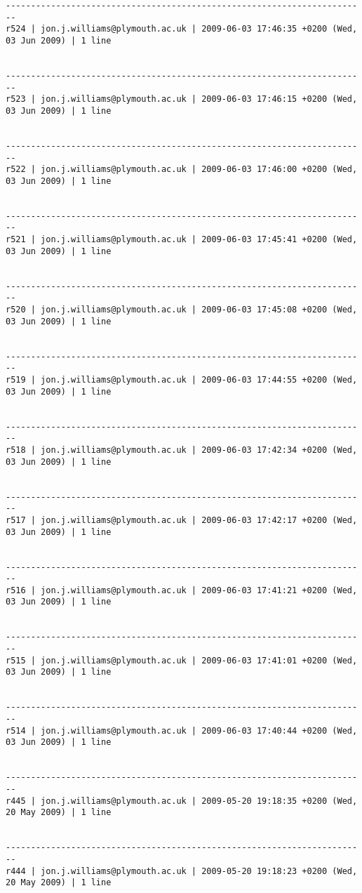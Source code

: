 \documentclass[9]{report}
\begin{document}
\begin{description}
\begin{verbatim}
------------------------------------------------------------------------
r524 | jon.j.williams@plymouth.ac.uk | 2009-06-03 17:46:35 +0200 (Wed, 03 Jun 2009) | 1 line


------------------------------------------------------------------------
r523 | jon.j.williams@plymouth.ac.uk | 2009-06-03 17:46:15 +0200 (Wed, 03 Jun 2009) | 1 line


------------------------------------------------------------------------
r522 | jon.j.williams@plymouth.ac.uk | 2009-06-03 17:46:00 +0200 (Wed, 03 Jun 2009) | 1 line


------------------------------------------------------------------------
r521 | jon.j.williams@plymouth.ac.uk | 2009-06-03 17:45:41 +0200 (Wed, 03 Jun 2009) | 1 line


------------------------------------------------------------------------
r520 | jon.j.williams@plymouth.ac.uk | 2009-06-03 17:45:08 +0200 (Wed, 03 Jun 2009) | 1 line


------------------------------------------------------------------------
r519 | jon.j.williams@plymouth.ac.uk | 2009-06-03 17:44:55 +0200 (Wed, 03 Jun 2009) | 1 line


------------------------------------------------------------------------
r518 | jon.j.williams@plymouth.ac.uk | 2009-06-03 17:42:34 +0200 (Wed, 03 Jun 2009) | 1 line


------------------------------------------------------------------------
r517 | jon.j.williams@plymouth.ac.uk | 2009-06-03 17:42:17 +0200 (Wed, 03 Jun 2009) | 1 line


------------------------------------------------------------------------
r516 | jon.j.williams@plymouth.ac.uk | 2009-06-03 17:41:21 +0200 (Wed, 03 Jun 2009) | 1 line


------------------------------------------------------------------------
r515 | jon.j.williams@plymouth.ac.uk | 2009-06-03 17:41:01 +0200 (Wed, 03 Jun 2009) | 1 line


------------------------------------------------------------------------
r514 | jon.j.williams@plymouth.ac.uk | 2009-06-03 17:40:44 +0200 (Wed, 03 Jun 2009) | 1 line


------------------------------------------------------------------------
r445 | jon.j.williams@plymouth.ac.uk | 2009-05-20 19:18:35 +0200 (Wed, 20 May 2009) | 1 line


------------------------------------------------------------------------
r444 | jon.j.williams@plymouth.ac.uk | 2009-05-20 19:18:23 +0200 (Wed, 20 May 2009) | 1 line



\end{verbatim}
\end{description}
\end{document}
